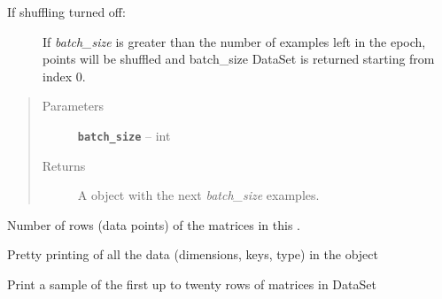 \documentclass[letterpaper,10pt,english]{sphinxmanual}
\begin{document}
\begin{fulllineitems}
\begin{fulllineitems}
\begin{description}
\begin{description}
\item[{If shuffling turned off:}] \leavevmode
If \emph{batch\_size} is greater than the number of examples left in the epoch, points will be shuffled and
batch\_size DataSet is returned starting from index 0.

\end{description}

\end{description}
\begin{quote}\begin{description}
\item[{Parameters}] \leavevmode
\textbf{\texttt{batch\_size}} -- int

\item[{Returns}] \leavevmode
A {\hyperref[loader:loader.DataSet]{\emph{}}} object with the next \emph{batch\_size} examples.

\end{description}\end{quote}

\end{fulllineitems}


\begin{fulllineitems}
\label{loader:loader.DataSet.num_examples}
Number of rows (data points) of the matrices in this {\hyperref[loader:loader.DataSet]{\emph{}}}.

\end{fulllineitems}


\begin{fulllineitems}
\label{loader:loader.DataSet.show}
Pretty printing of all the data (dimensions, keys, type) in the {\hyperref[loader:loader.DataSet]{\emph{}}} object

\end{fulllineitems}


\begin{fulllineitems}
\label{loader:loader.DataSet.showmore}
Print a sample of the first up to twenty rows of matrices in DataSet

\end{fulllineitems}


\end{fulllineitems}
\end{document}

